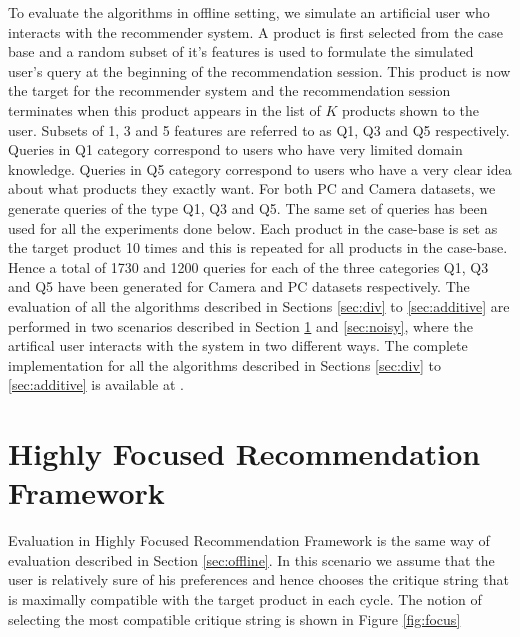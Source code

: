 To evaluate the algorithms in offline setting, we simulate an artificial user who interacts with the recommender system.
A product is first selected from the case base and a random subset of it's features is used to formulate the simulated user's query at the beginning of the recommendation session.
This product is now the target for the recommender system and the recommendation session terminates when this product appears in the list of $K$ products shown to the user. 
Subsets of 1, 3 and 5 features are referred to as Q1, Q3 and Q5 respectively.
Queries in Q1 category correspond to users who have very limited domain knowledge.
Queries in Q5 category correspond to users who have a very clear idea about what products they exactly want.
For both PC and Camera datasets, we generate queries of the type Q1, Q3 and Q5.
The same set of queries has been used for all the experiments done below.
Each product in the case-base is set as the target product 10 times and this is repeated for all products in the case-base.
Hence a total of 1730 and 1200 queries for each of the three categories Q1, Q3 and Q5 have been generated for Camera and PC datasets respectively.
The evaluation of all the algorithms described in Sections \ref{sec:div} to \ref{sec:additive} are performed in two scenarios described in Section \ref{sec:focus} and \ref{sec:noisy}, where the artifical user interacts with the system in two different ways.
The complete implementation for all the algorithms described in Sections \ref{sec:div} to \ref{sec:additive} is available at 
\cite{implementation}.

\section{Highly Focused Recommendation Framework}
\label{sec:focus}
Evaluation in Highly Focused Recommendation Framework is the same way of evaluation described in Section \ref{sec:offline}.
In this scenario we assume that the user is relatively sure of his preferences and hence chooses the critique string that is maximally compatible with the target product in each cycle.
The notion of selecting the most compatible critique string is shown in Figure \ref{fig:focus}


